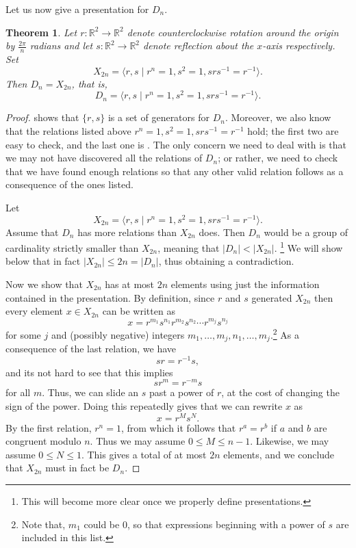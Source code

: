 \documentclass[12pt]{report}
\newtheorem{theorem}{Theorem}[chapter]
\numberwithin{equation}{section}
\numberwithin{theorem}{chapter}
\theoremstyle{definition}
\newtheorem*{basic properties}{Basic Properties}
\newtheorem*{Important Remark}{Important Remark}
\newcommand{\R}{\mathbb{R}}
\begin{document}
Let us now give a presentation for $D_n$.






\begin{theorem}\label{presentation for D_n}
Let $r:\R^2\to\R^2$ denote counterclockwise rotation around the origin by $\frac{2\pi}{n}$ radians and let $s:\R^2\to\R^2$ denote reflection about the $x$-axis respectively. Set 
$$X_{2n}=\langle r,s \mid r^n = 1, s^2 = 1, srs^{-1} = r^{-1} \rangle.$$ 
Then $D_n=X_{2n}$, that is,
$$
D_n = \langle r,s \mid r^n = 1, s^2 = 1, srs^{-1} = r^{-1} \rangle.
$$
\end{theorem}

\begin{proof}
 shows that $\{r,s\}$ is a set of generators for $D_n$. Moreover, we also know that the relations listed above $r^n = 1, s^2 = 1, srs^{-1} = r^{-1}$ hold; the first two are easy to check, and the last one is .  The only concern we need to deal with is that we may not have discovered all the relations of $D_n$; or rather, we need to check that we have found enough relations so that any other valid relation follows as a consequence of the ones listed. 

Let
$$X_{2n}=\langle r,s \mid r^n = 1, s^2 = 1, srs^{-1} = r^{-1} \rangle.$$
Assume that $D_n$ has more relations than $X_{2n}$ does. Then $D_n$ would be a group of cardinality strictly smaller than  $X_{2n}$, meaning that $|D_n|<|X_{2n}|$. \footnote{This will become more clear once we properly define presentations.}
We will show below that in fact $|X_{2n}|\leqslant 2n=|D_n|$, thus obtaining a contradiction.

Now we show that $X_{2n}$ has at most $2n$ elements using just the information contained in the presentation. By definition, since $r$ and $s$ generated $X_{2n}$ then every element $x\in X_{2n}$ can be written as 
$$x = r^{m_1} s^{n_1} r^{m_2} s^{n_2} \cdots r^{m_j} s^{n_j}$$ 
for some $j$ and (possibly negative) integers $m_1, \dots, m_j, n_1, \dots, m_j$.\footnote{Note that,
$m_1$ could be $0$, so that expressions beginning with a power of $s$ are included in this list.} 
As a consequence of the last relation, we have
$$sr = r^{-1}s,$$
and its not hard to see that this implies
$$sr^m = r^{-m} s$$
for all $m$. 
Thus, we can slide an $s$ past a power of $r$, at the cost of changing the sign of the power. Doing this repeatedly gives that we can rewrite $x$ as 
$$x = r^M s^N.$$
By the first relation, $r^n = 1$, from which it follows that $r^a = r^b$ if $a$ and $b$ are congruent modulo $n$. Thus we may assume $0 \leqslant M \leqslant n-1$. Likewise, we may assume $0 \leqslant N \leqslant 1$. This gives a total of at most $2n$ elements, and we conclude that $X_{2n}$ must in fact be $D_n$.
\end{proof}
\end{document}
